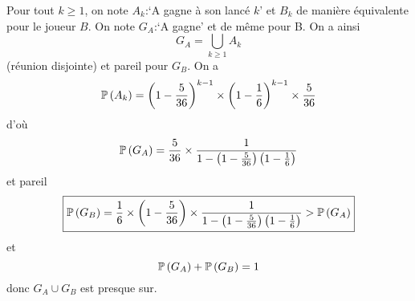 \begin{solution}
    Pour tout $k\geqslant1$, on note $A_{k}$:`A gagne à son lancé $k$' et $B_{k}$ de manière équivalente pour le joueur $B$. On note $G_{A}$:`A gagne' et de même pour B. On a ainsi
    \begin{equation}
        G_{A}=\bigcup_{k\geqslant 1}A_{k}
    \end{equation}
    (réunion disjointe) et pareil pour $G_{B}$. On a 
    \begin{equation}
        \P\left(A_{k}\right)=\left(1-\frac{5}{36}\right)^{k-1}\times\left(1-\frac{1}{6}\right)^{k-1}\times\frac{5}{36}
    \end{equation}
    d'où 
    \begin{equation}
        \P\left(G_{A}\right)=\frac{5}{36}\times\frac{1}{1-\left(1-\frac{5}{36}\right)\left(1-\frac{1}{6}\right)}
    \end{equation}
    et pareil 
    \begin{equation}
        \boxed{\P\left(G_{B}\right)=\frac{1}{6}\times\left(1-\frac{5}{36}\right)\times\frac{1}{1-\left(1-\frac{5}{36}\right)\left(1-\frac{1}{6}\right)}>\P\left(G_{A}\right)}
    \end{equation}
    et 
    \begin{equation}
        \P\left(G_{A}\right)+\P\left(G_{B}\right)=1
    \end{equation}
    donc $G_{A}\cup G_{B}$ est presque sur.
\end{solution}

